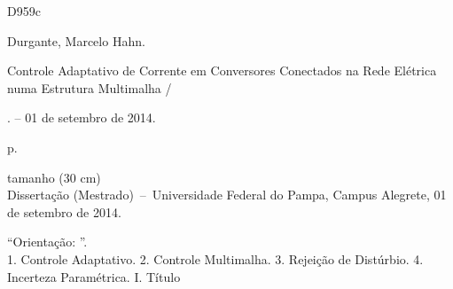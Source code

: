 
\vspace*{\fill}					%
\begin{center}
\begin{fmpage}{12.5cm}
	\begin{minipage}[t][7.75cm][t]{0.1\textwidth}
		\vspace{1cm}
		D959c
		\vspace*{\fill}%
	\end{minipage}
	\begin{minipage}[t][7.75cm][t]{0.8\textwidth}
		\vspace*{\fill}
		Durgante, Marcelo Hahn.

		\hspace{0.46cm} Controle Adaptativo de Corrente em Conversores Conectados na Rede Elétrica numa
		Estrutura Multimalha /

		\imprimirautor. -- 01 de setembro de 2014.

		\hspace{0.46cm} \pageref{LastPage} p.

		tamanho (30 cm)\\

		\hspace{0.46cm} Dissertação (Mestrado)~--~Universidade Federal do Pampa, Campus Alegrete, 01 de setembro de 2014.

		\hspace{0.46cm} ``Orientação: \imprimirorientador''.\\

		\hspace{0.46cm}
			1. Controle Adaptativo.
			2. Controle Multimalha.
			3. Rejeição de Distúrbio.
			4. Incerteza Paramétrica.
			I. Título\\
		\vspace*{\fill}
	\end{minipage}
\end{fmpage}
\end{center}
